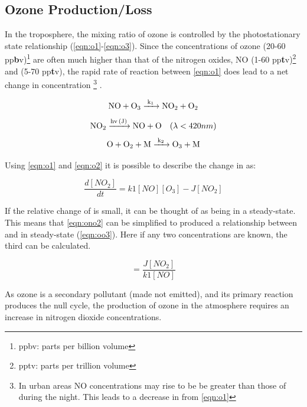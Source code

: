 \subsection{Ozone Production/Loss}\label{sec:o3prod}
In the troposphere, the mixing ratio of ozone is controlled by the photostationary state relationship (\autoref{eqn:o1}-\ref{eqn:o3}).
Since the concentrations of ozone (20-60 pp\textbf{b}v)\footnote{ppbv: parts per billion volume} are often much higher than that of the nitrogen oxides, NO (1-60 pp\textbf{t}v)\footnote{pptv: parts per trillion volume} and  (5-70 pp\textbf{t}v), the rapid rate of reaction between \autoref{eqn:o1} does lead to a net change in  concentration \footnote{In urban areas NO concentrations may rise to be be greater than those of  during the night. This leads to a decrease in from \autoref{eqn:o1}} \citep{fundamentals}.



\begin{equation}
  \centering
\ce{NO + O3 ->[k1] NO2 +O2} \label{eqn:o1}
\end{equation}
\begin{equation}
  \centering
 \ce{NO2 ->[hv (J)] NO + O }\ \ \ (\lambda < 420nm) \label{eqn:o2}
\end{equation}
 \begin{equation}
   \centering
\ce{O + O2 + M ->[k2] O3 + M}\label{eqn:o3}
\end{equation}

Using \autoref{eqn:o1} and \autoref{eqn:o2} it is possible to describe the change in  as:

\begin{equation}
  \frac{d[NO_2]}{dt} = k1[NO][O_3] - J[NO_2]
  \label{eqn:ono2}
\end{equation}

If the relative change of  is small, it can be thought of as being in a steady-state. This means that \autoref{eqn:ono2} can be simplified to produced a relationship between  and  in steady-state (\autoref{eqn:oo3}). Here if any two concentrations are known, the third can be calculated.

\begin{equation}
  [O_3] = \frac{J[NO_2]}{k1[NO]}
  \label{eqn:oo3}
\end{equation}

As ozone is a secondary pollutant (made not emitted), and its primary reaction produces the null cycle, the production of ozone in the atmosphere requires an increase in nitrogen dioxide concentrations.

